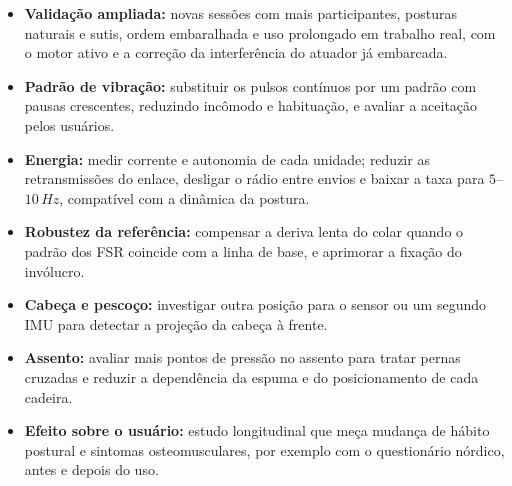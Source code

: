\begin{itemize}[nosep]
  \item \textbf{Validação ampliada:} novas sessões com mais participantes,
        posturas naturais e sutis, ordem embaralhada e uso prolongado em
        trabalho real, com o motor ativo e a correção da interferência do
        atuador já embarcada.
  \item \textbf{Padrão de vibração:} substituir os pulsos contínuos por um
        padrão com pausas crescentes, reduzindo incômodo e habituação, e
        avaliar a aceitação pelos usuários.
  \item \textbf{Energia:} medir corrente e autonomia de cada unidade; reduzir
        as retransmissões do enlace, desligar o rádio entre envios e baixar a
        taxa para $5$--$10\,Hz$, compatível com a dinâmica da postura.
  \item \textbf{Robustez da referência:} compensar a deriva lenta do colar
        quando o padrão dos FSR coincide com a linha de base, e aprimorar a
        fixação do invólucro.
  \item \textbf{Cabeça e pescoço:} investigar outra posição para o sensor ou
        um segundo IMU para detectar a projeção da cabeça à frente.
  \item \textbf{Assento:} avaliar mais pontos de pressão no assento para
        tratar pernas cruzadas e reduzir a dependência da espuma e do
        posicionamento de cada cadeira.
  \item \textbf{Efeito sobre o usuário:} estudo longitudinal que meça mudança
        de hábito postural e sintomas osteomusculares, por exemplo com o
        questionário nórdico, antes e depois do uso.
\end{itemize}
